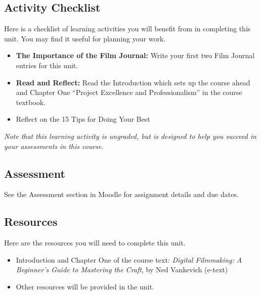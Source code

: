 \documentclass[
]{book}
\providecommand{\tightlist}{%
  \setlength{\itemsep}{0pt}\setlength{\parskip}{0pt}}
\begin{document}
\hypertarget{activity-checklist}{%
\subsection*{Activity Checklist}\label{activity-checklist}}

\begin{reflect}
Here is a checklist of learning activities you will benefit from in completing this unit. You may find it useful for planning your work.

\begin{itemize}
\tightlist
\item
  \textbf{The Importance of the Film Journal:} Write your first two Film Journal entries for this unit.
\item
  \textbf{Read and Reflect:} Read the Introduction which sets up the course ahead and Chapter One ``Project Excellence and Professionalism'' in the course textbook.
\item
  Reflect on the 15 Tips for Doing Your Best
\end{itemize}

\emph{Note that this learning activity is ungraded, but is designed to help you succeed in your assessments in this course.}
\end{reflect}

\hypertarget{assessment}{%
\subsection*{Assessment}\label{assessment}}

See the Assessment section in Moodle for assignment details and due dates.

\hypertarget{resources}{%
\subsection*{Resources}\label{resources}}

Here are the resources you will need to complete this unit.

\begin{itemize}
\tightlist
\item
  Introduction and Chapter One of the course text: \emph{Digital Filmmaking: A Beginner's Guide to Mastering the Craft}, by Ned Vankevich (e-text)
\item
  Other resources will be provided in the unit.
\end{itemize}
\end{document}
